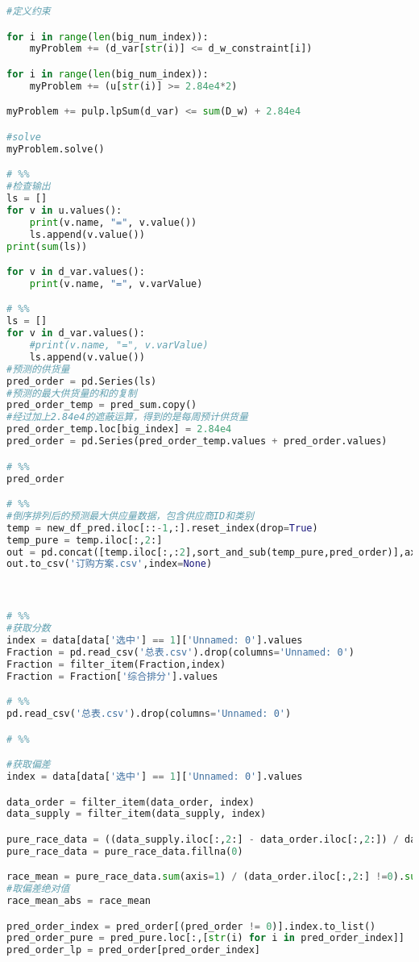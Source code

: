 \begin{appendices}
\begin{lstlisting}[language=python]
#定义约束

for i in range(len(big_num_index)):
    myProblem += (d_var[str(i)] <= d_w_constraint[i])

for i in range(len(big_num_index)):
    myProblem += (u[str(i)] >= 2.84e4*2)

myProblem += pulp.lpSum(d_var) <= sum(D_w) + 2.84e4

#solve
myProblem.solve()

# %%
#检查输出
ls = []
for v in u.values():
    print(v.name, "=", v.value())
    ls.append(v.value())
print(sum(ls))

for v in d_var.values():
    print(v.name, "=", v.varValue)

# %%
ls = []
for v in d_var.values():
    #print(v.name, "=", v.varValue)
    ls.append(v.value())
#预测的供货量
pred_order = pd.Series(ls)
#预测的最大供货量的和的复制
pred_order_temp = pred_sum.copy()
#经过加上2.84e4的遮蔽运算，得到的是每周预计供货量
pred_order_temp.loc[big_index] = 2.84e4
pred_order = pd.Series(pred_order_temp.values + pred_order.values)

# %%
pred_order

# %%
#倒序排列后的预测最大供应量数据，包含供应商ID和类别
temp = new_df_pred.iloc[::-1,:].reset_index(drop=True)
temp_pure = temp.iloc[:,2:]
out = pd.concat([temp.iloc[:,:2],sort_and_sub(temp_pure,pred_order)],axis=1)
out.to_csv('订购方案.csv',index=None)



# %%
#获取分数
index = data[data['选中'] == 1]['Unnamed: 0'].values
Fraction = pd.read_csv('总表.csv').drop(columns='Unnamed: 0')
Fraction = filter_item(Fraction,index)
Fraction = Fraction['综合排分'].values

# %%
pd.read_csv('总表.csv').drop(columns='Unnamed: 0')

# %%

#获取偏差
index = data[data['选中'] == 1]['Unnamed: 0'].values

data_order = filter_item(data_order, index)
data_supply = filter_item(data_supply, index)

pure_race_data = ((data_supply.iloc[:,2:] - data_order.iloc[:,2:]) / data_order.iloc[:,2:])
pure_race_data = pure_race_data.fillna(0)

race_mean = pure_race_data.sum(axis=1) / (data_order.iloc[:,2:] !=0).sum(axis=1)
#取偏差绝对值
race_mean_abs = race_mean

pred_order_index = pred_order[(pred_order != 0)].index.to_list()
pred_order_pure = pred_pure.loc[:,[str(i) for i in pred_order_index]]
pred_order_lp = pred_order[pred_order_index]


\end{lstlisting}
\end{appendices}
